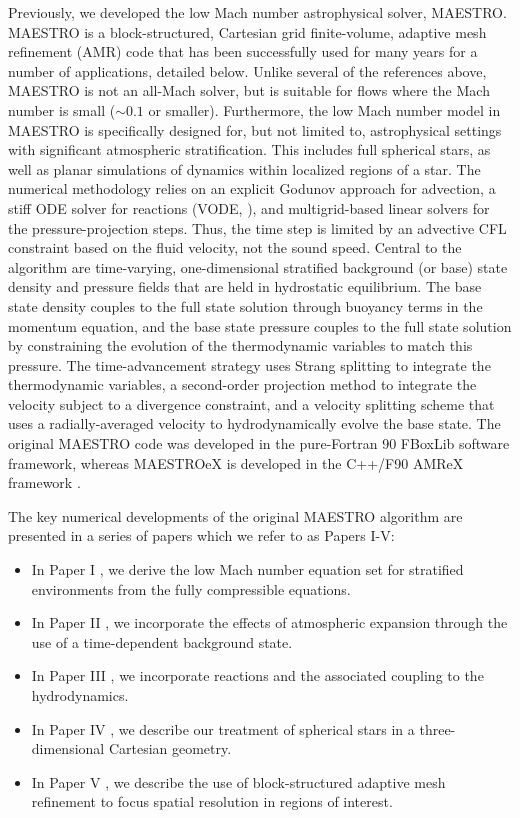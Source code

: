 \documentclass{aastex62}
\begin{document}
Previously, we developed the low Mach number astrophysical solver, MAESTRO.
MAESTRO is a block-structured, Cartesian grid finite-volume, adaptive mesh refinement (AMR)
code that has been successfully used for many years for a number of applications, detailed below.
Unlike several of the references above, MAESTRO is not an all-Mach solver, but is suitable for
flows where the Mach number is small ($\sim 0.1$ or smaller).
Furthermore, the low Mach number model in MAESTRO is specifically designed for, but not limited
to, astrophysical settings with significant atmospheric stratification.
This includes full spherical stars, as well as planar simulations of dynamics within localized
regions of a star.
The numerical methodology relies on an explicit Godunov approach for advection, a stiff ODE
solver for reactions (VODE, \citealt{vode}), and multigrid-based linear solvers for the
pressure-projection steps.  Thus, the time step is limited by an advective CFL constraint based on the 
fluid velocity, not the sound speed.
Central to the algorithm are time-varying, one-dimensional stratified background (or base) state
density and pressure fields that are held in hydrostatic equilibrium.
The base state density couples to the full state solution through buoyancy terms in the momentum equation,
and the base state pressure couples to the full state solution by constraining the evolution of the
thermodynamic variables to match this pressure.
The time-advancement strategy uses Strang splitting to integrate the thermodynamic variables, a
second-order projection method to integrate the velocity subject to a divergence constraint,
and a velocity splitting scheme that uses a radially-averaged velocity to hydrodynamically evolve the base state.
The original MAESTRO code was developed in the pure-Fortran 90 FBoxLib software framework, whereas
MAESTROeX is developed in the C++/F90 AMReX framework \citep{AMReX,AMReX_JOSS}.

The key numerical developments of the original MAESTRO algorithm are presented in a series of
papers which we refer to as Papers I-V:
\begin{itemize}
\item In Paper I \citep{MAESTRO_I}, we derive the low Mach number equation set for stratified
environments from the fully compressible equations.
\item In Paper II \citep{MAESTRO_II}, we incorporate the effects of atmospheric expansion
through the use of a time-dependent background state.
\item In Paper III \citep{MAESTRO_III}, we incorporate reactions and the associated coupling
to the hydrodynamics.
\item In Paper IV \citep{MAESTRO_IV}, we describe our treatment of spherical stars in a
three-dimensional Cartesian geometry.
\item In Paper V \citep{MAESTRO_V}, we describe the use of block-structured adaptive mesh
refinement to focus spatial resolution in regions of interest.
\end{itemize}
\end{document}

